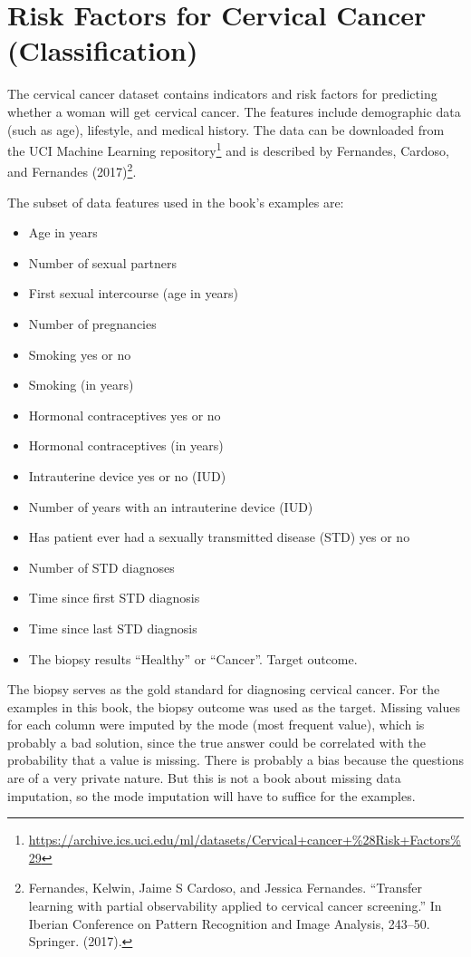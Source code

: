 \documentclass[
  12pt,
]{krantz}
\providecommand{\tightlist}{%
  \setlength{\itemsep}{0pt}\setlength{\parskip}{0pt}}
\renewcommand{\href}[2]{#2\footnote{\url{#1}}}
\begin{document}
\hypertarget{cervical}{%
\section{Risk Factors for Cervical Cancer (Classification)}\label{cervical}}

The cervical cancer dataset contains indicators and risk factors for predicting whether a woman will get cervical cancer.
The features include demographic data (such as age), lifestyle, and medical history.
The data can be downloaded from the \href{https://archive.ics.uci.edu/ml/datasets/Cervical+cancer+\%28Risk+Factors\%29}{UCI Machine Learning repository} and is described by Fernandes, Cardoso, and Fernandes (2017)\footnote{Fernandes, Kelwin, Jaime S Cardoso, and Jessica Fernandes. ``Transfer learning with partial observability applied to cervical cancer screening.'' In Iberian Conference on Pattern Recognition and Image Analysis, 243--50. Springer. (2017).}.

The subset of data features used in the book's examples are:

\begin{itemize}
\tightlist
\item
  Age in years
\item
  Number of sexual partners
\item
  First sexual intercourse (age in years)
\item
  Number of pregnancies
\item
  Smoking yes or no
\item
  Smoking (in years)
\item
  Hormonal contraceptives yes or no
\item
  Hormonal contraceptives (in years)
\item
  Intrauterine device yes or no (IUD)
\item
  Number of years with an intrauterine device (IUD)
\item
  Has patient ever had a sexually transmitted disease (STD) yes or no
\item
  Number of STD diagnoses
\item
  Time since first STD diagnosis
\item
  Time since last STD diagnosis
\item
  The biopsy results ``Healthy'' or ``Cancer''. Target outcome.
\end{itemize}

The biopsy serves as the gold standard for diagnosing cervical cancer.
For the examples in this book, the biopsy outcome was used as the target.
Missing values for each column were imputed by the mode (most frequent value), which is probably a bad solution, since the true answer could be correlated with the probability that a value is missing.
There is probably a bias because the questions are of a very private nature.
But this is not a book about missing data imputation, so the mode imputation will have to suffice for the examples.
\end{document}
